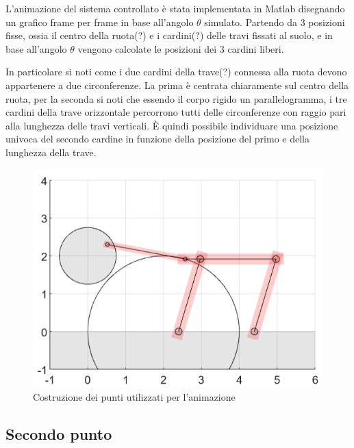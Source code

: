 \documentclass[a4paper, 11pt]{article}
\begin{document}
L'animazione del sistema controllato è stata implementata in Matlab disegnando un grafico frame per frame in base all'angolo $\theta$ simulato.
Partendo da 3 posizioni fisse, ossia il centro della ruota(?) e i cardini(?) delle travi fissati al suolo, e in base all'angolo $\theta$ vengono calcolate le posizioni dei 3 cardini liberi.

In particolare si noti come i due cardini della trave(?) connessa alla ruota devono appartenere a due circonferenze. La prima è centrata chiaramente sul centro della ruota, per la seconda si noti che essendo il corpo rigido un parallelogramma, i tre cardini della trave orizzontale percorrono tutti delle circonferenze con raggio pari alla lunghezza delle travi verticali. È quindi possibile individuare una posizione univoca del secondo cardine in funzione della posizione del primo e della lunghezza della trave.

\begin{figure}[h!]
	\centering
	\includegraphics[width=0.4\linewidth]{./images/animazione_costruzione.png}
	\caption{Costruzione dei punti utilizzati per l'animazione}
	\label{fig:animazione_costruzione}
\end{figure}

\subsection{Secondo punto}
\end{document}
